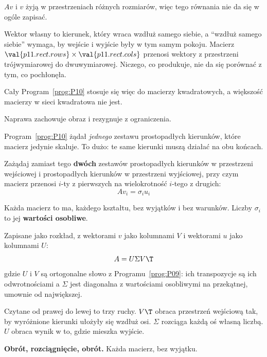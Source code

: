 \begin{fr}
\begin{ansblock}
$Av$ i $v$ żyją w przestrzeniach różnych rozmiarów, więc tego równania nie da
się w ogóle zapisać.
\end{ansblock}

Wektor własny to kierunek, który wraca wzdłuż samego siebie, a \enquote{wzdłuż
samego siebie} wymaga, by wejście i wyjście były w tym samym pokoju. Macierz
$\val{p11.rect.rows} \times \val{p11.rect.cols}$ przenosi wektory z przestrzeni
trójwymiarowej do dwuwymiarowej. Niczego, co produkuje, nie da się porównać z
tym, co pochłonęła.

Cały Program~\ref{prog:P10} stosuje się więc do macierzy kwadratowych, a
większość macierzy w sieci kwadratowa nie jest.
\end{fr}

\begin{fr}
Naprawa zachowuje obraz i rezygnuje z ograniczenia.

Program~\ref{prog:P10} żądał \emph{jednego} zestawu prostopadłych kierunków,
które macierz jedynie skaluje. To dużo: te same kierunki muszą działać na obu
końcach.

Zażądaj zamiast tego \textbf{dwóch} zestawów \dash{} prostopadłych kierunków w
przestrzeni wejściowej i prostopadłych kierunków w przestrzeni wyjściowej, przy
czym macierz przenosi $i$-ty z pierwszych na wielokrotność $i$-tego z drugich:
\[ Av_i = \sigma_i u_i \]

Każda macierz to ma, każdego kształtu, bez wyjątków i bez warunków. Liczby
$\sigma_i$ to jej \textbf{wartości osobliwe}.
\end{fr}

\begin{fr}
Zapisane jako rozkład, z wektorami $v$ jako kolumnami $V$ i wektorami $u$ jako
kolumnami $U$:
\[ A = U\Sigma V\T \]
gdzie $U$ i $V$ są ortogonalne \dash{} słowo z Programu~\ref{prog:P09}: ich
transpozycje są ich odwrotnościami \dash{} a $\Sigma$ jest diagonalna z
wartościami osobliwymi na przekątnej, umownie od największej.

Czytane od prawej do lewej to trzy ruchy. $V\T$ obraca przestrzeń wejściową
tak, by wyróżnione kierunki ułożyły się wzdłuż osi. $\Sigma$ rozciąga każdą oś
własną liczbą. $U$ obraca wynik w to, gdzie mieszka wyjście.

\textbf{Obrót, rozciągnięcie, obrót.} Każda macierz, bez wyjątku.
\end{fr}


